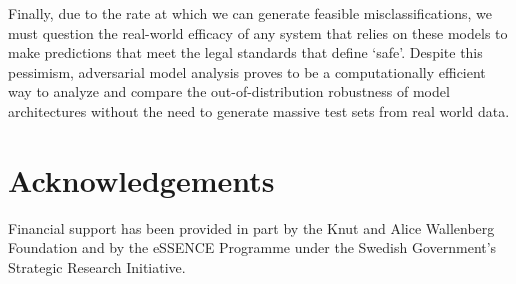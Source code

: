 \documentclass[lettersize,journal]{IEEEtran}
\begin{document}
Finally, due to the rate at which we can generate feasible misclassifications, we must question the real-world efficacy of any system that relies on these models to make predictions that meet the legal standards that define `safe'. Despite this pessimism, adversarial model analysis proves to be a computationally efficient way to analyze and compare the out-of-distribution robustness of model architectures without the need to generate massive test sets from real world data.

\section{Acknowledgements}
Financial support has been provided in part by the Knut and Alice Wallenberg Foundation and by the eSSENCE Programme under the Swedish Government’s Strategic Research Initiative.



\begin{thebibliography}

\end{thebibliography}
\end{document}
